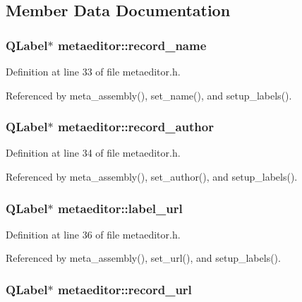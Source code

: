 \subsection{Member Data Documentation}
\subsubsection{\setlength{\rightskip}{0pt plus 5cm}QLabel$\ast$ {\bf metaeditor::record\_\-name}\hspace{0.3cm}{\tt  [private]}}\label{classmetaeditor_639cc799d7e9b8922587a686c4fd3c4a}




Definition at line 33 of file metaeditor.h.

Referenced by meta\_\-assembly(), set\_\-name(), and setup\_\-labels().
\subsubsection{\setlength{\rightskip}{0pt plus 5cm}QLabel$\ast$ {\bf metaeditor::record\_\-author}\hspace{0.3cm}{\tt  [private]}}\label{classmetaeditor_db93ed415ca11aebf0a1ce4aeb72472c}




Definition at line 34 of file metaeditor.h.

Referenced by meta\_\-assembly(), set\_\-author(), and setup\_\-labels().
\subsubsection{\setlength{\rightskip}{0pt plus 5cm}QLabel$\ast$ {\bf metaeditor::label\_\-url}\hspace{0.3cm}{\tt  [private]}}\label{classmetaeditor_2c3958d7df636a7641a39db955cef3c6}




Definition at line 36 of file metaeditor.h.

Referenced by meta\_\-assembly(), set\_\-url(), and setup\_\-labels().
\subsubsection{\setlength{\rightskip}{0pt plus 5cm}QLabel$\ast$ {\bf metaeditor::record\_\-url}\hspace{0.3cm}{\tt  [private]}}\label{classmetaeditor_5db8046dfedb5d0f316315adaeac5220}




